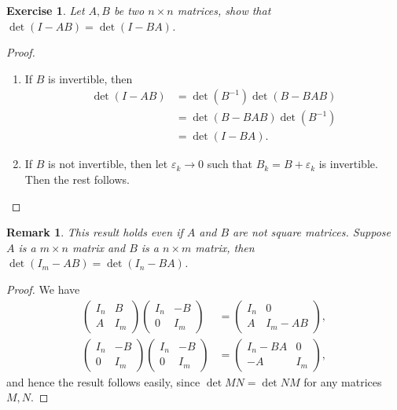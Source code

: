 \documentclass[11pt]{book}
\newtheorem{exercise}{Exercise}[section]
\newtheorem{remark}{Remark}[chapter]
\theoremstyle{definition}
\numberwithin{equation}{chapter}
\begin{document}
\medskip

\begin{exercise}
Let $A, B$ be two $n \times n$ matrices, show that $\det (I - AB) = \det (I - BA)$.
\end{exercise}
\begin{proof}
~\begin{enumerate}[label=(\alph*)]
    \item If $B$ is invertible, then 
    \begin{align*}
        \det (I - AB) & = \det \left(B^{-1}\right) \det (B - BAB) \\
        & = \det (B - BAB) \det \left(B^{-1}\right) \\
        & = \det (I - BA).
    \end{align*}
    
    \item If $B$ is not invertible, then let $\varepsilon_k \to 0$ such that $B_k = B + \varepsilon_k$ is invertible. Then the rest follows.
\end{enumerate}
\end{proof}

\begin{remark}
This result holds even if $A$ and $B$ are not square matrices. Suppose $A$ is a $m \times n$ matrix and $B$ is a $n \times m$ matrix, then $\det(I_m - AB) = \det (I_n - BA)$.
\end{remark}
\begin{proof}
We have
\begin{align*}
    \begin{pmatrix}
        I_n & B \\
        A & I_m
    \end{pmatrix} \begin{pmatrix}
        I_n & -B \\
        0 & I_m
    \end{pmatrix} & = \begin{pmatrix}
        I_n & 0 \\
        A & I_m - AB
    \end{pmatrix}, \\
    \begin{pmatrix}
        I_n & -B \\
        0 & I_m
    \end{pmatrix} \begin{pmatrix}
        I_n & -B \\
        0 & I_m
    \end{pmatrix} & = \begin{pmatrix}
        I_n - BA & 0 \\
        -A & I_m
    \end{pmatrix},
\end{align*}
and hence the result follows easily, since $\det MN = \det NM$ for any matrices $M, N$.
\end{proof}
\end{document}
